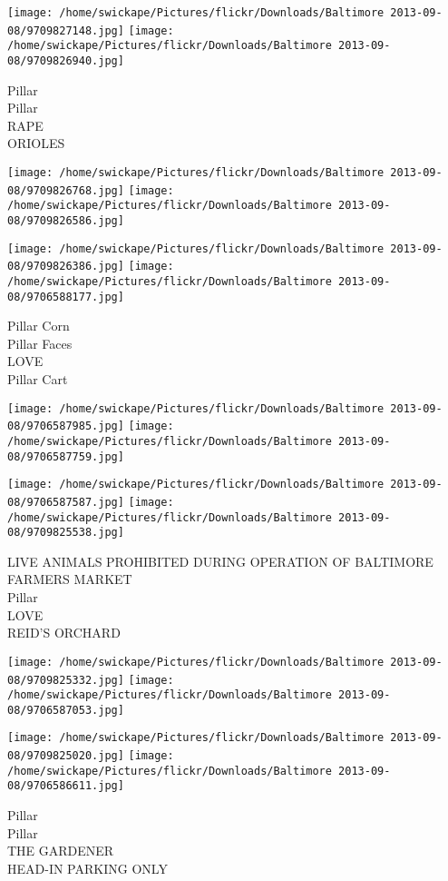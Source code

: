 \documentclass[10pt,letterpaper]{article}
\begin{document}
\texttt{[image: /home/swickape/Pictures/flickr/Downloads/Baltimore 2013-09-08/9709827148.jpg]}
\texttt{[image: /home/swickape/Pictures/flickr/Downloads/Baltimore 2013-09-08/9709826940.jpg]}

Pillar\\
Pillar\\
RAPE\\
ORIOLES
\pagebreak

\texttt{[image: /home/swickape/Pictures/flickr/Downloads/Baltimore 2013-09-08/9709826768.jpg]}
\texttt{[image: /home/swickape/Pictures/flickr/Downloads/Baltimore 2013-09-08/9709826586.jpg]}

\texttt{[image: /home/swickape/Pictures/flickr/Downloads/Baltimore 2013-09-08/9709826386.jpg]}
\texttt{[image: /home/swickape/Pictures/flickr/Downloads/Baltimore 2013-09-08/9706588177.jpg]}

Pillar Corn\\
Pillar Faces\\
LOVE\\
Pillar Cart
\pagebreak

\texttt{[image: /home/swickape/Pictures/flickr/Downloads/Baltimore 2013-09-08/9706587985.jpg]}
\texttt{[image: /home/swickape/Pictures/flickr/Downloads/Baltimore 2013-09-08/9706587759.jpg]}

\texttt{[image: /home/swickape/Pictures/flickr/Downloads/Baltimore 2013-09-08/9706587587.jpg]}
\texttt{[image: /home/swickape/Pictures/flickr/Downloads/Baltimore 2013-09-08/9709825538.jpg]}

LIVE ANIMALS PROHIBITED DURING OPERATION OF BALTIMORE FARMERS MARKET\\
Pillar\\
LOVE\\
REID'S ORCHARD
\pagebreak

\texttt{[image: /home/swickape/Pictures/flickr/Downloads/Baltimore 2013-09-08/9709825332.jpg]}
\texttt{[image: /home/swickape/Pictures/flickr/Downloads/Baltimore 2013-09-08/9706587053.jpg]}

\texttt{[image: /home/swickape/Pictures/flickr/Downloads/Baltimore 2013-09-08/9709825020.jpg]}
\texttt{[image: /home/swickape/Pictures/flickr/Downloads/Baltimore 2013-09-08/9706586611.jpg]}

Pillar\\
Pillar\\
THE GARDENER\\
HEAD{-}IN PARKING ONLY
\pagebreak
\end{document}
